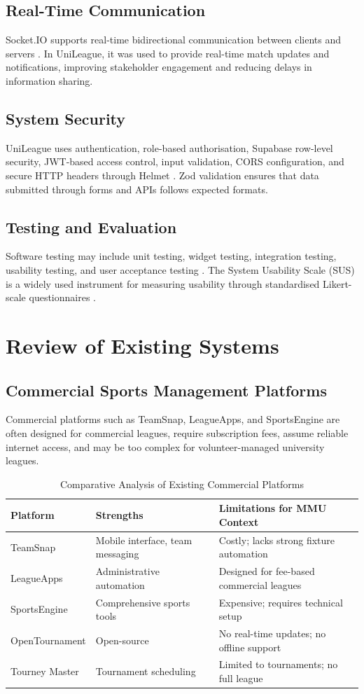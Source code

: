 \documentclass[12pt,a4paper]{report}
\begin{document}
\subsection{Real-Time Communication}
Socket.IO supports real-time bidirectional communication between clients and servers
\cite{socketio2024}. In UniLeague, it was used to provide real-time match updates and
notifications, improving stakeholder engagement and reducing delays in information sharing.

\subsection{System Security}
UniLeague uses authentication, role-based authorisation, Supabase row-level security,
JWT-based access control, input validation, CORS configuration, and secure HTTP headers
through Helmet \cite{helmet2024}. Zod validation ensures that data submitted through
forms and APIs follows expected formats.

\subsection{Testing and Evaluation}
Software testing may include unit testing, widget testing, integration testing, usability
testing, and user acceptance testing \cite{pressman2019}. The System Usability Scale (SUS)
is a widely used instrument for measuring usability through standardised Likert-scale
questionnaires \cite{brooke1996}.

\section{Review of Existing Systems}
\subsection{Commercial Sports Management Platforms}
Commercial platforms such as TeamSnap, LeagueApps, and SportsEngine are often designed for
commercial leagues, require subscription fees, assume reliable internet access, and may be
too complex for volunteer-managed university leagues.

\begin{table}[H]
\centering
\caption{Comparative Analysis of Existing Commercial Platforms \cite{fortune2024}}
\begin{tabular}{p{3cm}p{4cm}p{6cm}}
\toprule
\textbf{Platform} & \textbf{Strengths} & \textbf{Limitations for MMU Context}\\
\midrule
TeamSnap & Mobile interface, team messaging & Costly; lacks strong fixture automation\\
LeagueApps & Administrative automation & Designed for fee-based commercial leagues\\
SportsEngine & Comprehensive sports tools & Expensive; requires technical setup\\
OpenTournament & Open-source & No real-time updates; no offline support\\
Tourney Master & Tournament scheduling & Limited to tournaments; no full league\\
\bottomrule
\end{tabular}
\end{table}
\end{document}
